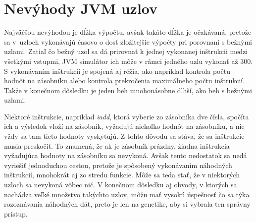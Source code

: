 \section{Nevýhody JVM uzlov}
\label{sec:disadvantages}

Najväčšou nevýhodou je dĺžka výpočtu, avšak takáto dĺžka je očakávaná, pretože sa v~uzloch vykonávajú časovo o dosť zložitejšie výpočty pri porovnaní s bežnými uzlami. Zatiaľ čo bežný uzol sa dá prirovnať k jednej vykonanej inštrukcii medzi všetkými vstupmi, JVM simulátor ich môže v rámci jedného uzlu vykonať až 300. S vykonávaním inštrukcií je spojená aj réžia, ako napríklad kontrola počtu hodnôt na zásobníku alebo kontrola prekročenia maximálneho počtu inštrukcií. Takže v konečnom dôsledku je jeden beh mnohonásobne dlhší, ako beh s bežnými uzlami.

Niektoré inštrukcie, napríklad \textit{iadd}, ktorá vyberie zo zásobníka dve čísla, spočíta ich a výsledok vloží na zásobník, vyžadujú niekoľko hodnôt na zásobníku, a nie vždy sa tam tieto hodnoty vyskytujú. Z tohto dôvodu sa stáva, že sa inštrukcie musia preskočiť. To znamená, že ak je zásobník prázdny, žiadna inštrukcia vyžadujúca hodnoty na zásobníku sa nevykoná. Avšak tento nedostatok sa nedá vyriešiť jednoduchou cestou, pretože je spôsobený vykonávaním náhodných inštrukcií, mnohokrát aj zo stredu funkcie. Môže sa teda stať, že v niektorých uzloch sa nevykoná vôbec nič. V konečnom dôsledku aj obvody, v ktorých sa nachádza veľké množstvo takýchto uzlov, môžu mať vysokú úspešnosť čo sa týka rozoznávania náhodných dát, preto je len na genetike, aby si vybrala ten správny prístup. 
